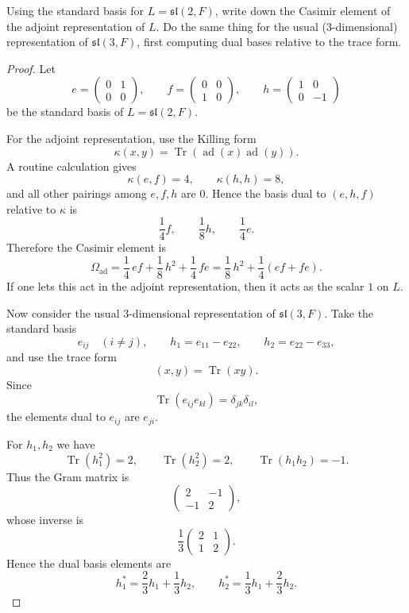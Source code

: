 \begin{exercise}
    Using the standard basis for $L=\mathfrak{sl}(2,F)$, write down the Casimir element of the adjoint representation of $L$. Do the same thing for the usual (3-dimensional) representation of $\mathfrak{sl}(3,F)$, first computing dual bases relative to the trace form.
\end{exercise}

\begin{proof}
    Let
    \[
        e=\begin{pmatrix}0&1\\0&0\end{pmatrix},\qquad
        f=\begin{pmatrix}0&0\\1&0\end{pmatrix},\qquad
        h=\begin{pmatrix}1&0\\0&-1\end{pmatrix}
    \]
    be the standard basis of $L=\mathfrak{sl}(2,F)$.

    For the adjoint representation, use the Killing form
    \[
        \kappa(x,y)=\operatorname{Tr}(\operatorname{ad}(x)\operatorname{ad}(y)).
    \]
    A routine calculation gives
    \[
        \kappa(e,f)=4,\qquad \kappa(h,h)=8,
    \]
    and all other pairings among $e,f,h$ are $0$. Hence the basis dual to
    $(e,h,f)$ relative to $\kappa$ is
    \[
        \frac14 f,\qquad \frac18 h,\qquad \frac14 e.
    \]
    Therefore the Casimir element is
    \[
        \Omega_{\mathrm{ad}}
        =\frac14\,ef+\frac18\,h^2+\frac14\,fe
        =\frac18\,h^2+\frac14(ef+fe).
    \]
    If one lets this act in the adjoint representation, then it acts as the scalar
    $1$ on $L$.

    Now consider the usual $3$-dimensional representation of $\mathfrak{sl}(3,F)$.
    Take the standard basis
    \[
        e_{ij}\quad (i\neq j),\qquad
        h_1=e_{11}-e_{22},\qquad
        h_2=e_{22}-e_{33},
    \]
    and use the trace form
    \[
        (x,y)=\operatorname{Tr}(xy).
    \]
    Since
    \[
        \operatorname{Tr}(e_{ij}e_{kl})=\delta_{jk}\delta_{il},
    \]
    the elements dual to $e_{ij}$ are $e_{ji}$.

    For $h_1,h_2$ we have
    \[
        \operatorname{Tr}(h_1^2)=2,\qquad
        \operatorname{Tr}(h_2^2)=2,\qquad
        \operatorname{Tr}(h_1h_2)=-1.
    \]
    Thus the Gram matrix is
    \[
        \begin{pmatrix}
            2  & -1 \\
            -1 & 2
        \end{pmatrix},
    \]
    whose inverse is
    \[
        \frac13
        \begin{pmatrix}
            2 & 1 \\
            1 & 2
        \end{pmatrix}.
    \]
    Hence the dual basis elements are
    \[
        h_1^*=\frac23h_1+\frac13h_2,\qquad
        h_2^*=\frac13h_1+\frac23h_2.
    \]


\end{proof}
